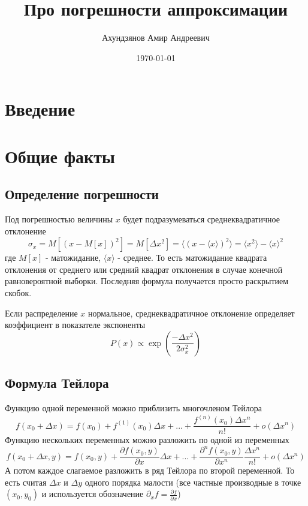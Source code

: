 \documentclass[a4paper,12pt]{article}
\begin{document}
\title{Про погрешности аппроксимации}
\author{Ахундзянов Амир Андреевич}
\date{\today}
\maketitle
\section{Введение}

\section{Общие факты}
\subsection{Определение погрешности}
Под погрешностью величины $x$ будет подразумеваться среднеквадратичное отклонение
$$ \sigma_x = M[(x-M[x])^2] = M[\Delta x^2] = \langle(x - \langle x \rangle)^2\rangle = \langle x^2\rangle - \langle x\rangle^2 $$
где $M[x]$ - матожидание, $\langle x\rangle$ - среднее.
То есть матожидание квадрата отклонения от среднего или средний квадрат отклонения в случае конечной равновероятной выборки. Последняя формула получается просто раскрытием скобок.

Если распределение $x$ нормальное, среднеквадратичное отклонение определяет коэффициент в показателе экспоненты
\[ P(x) \propto \exp \left(\frac{-\Delta x^2}{2\sigma_x^2} \right) \]
\subsection{Формула Тейлора}
Функцию одной переменной можно приблизить многочленом Тейлора
$$ f(x_0 + \Delta x) = f(x_0) + f^{(1)}(x_0) \Delta x + ... + \frac{f^{(n)}(x_0) \Delta x^n}{n!} + o(\Delta x^n)$$
Функцию нескольких переменных можно разложить по одной из переменных
$$ f(x_0 + \Delta x, y) = 
f(x_0, y) + 
\frac{\partial f(x_0, y)}{\partial x} \Delta x + ... + \frac{\partial^n f(x_0, y)}{\partial x^n}\frac{ \Delta x^n}{n!} + o(\Delta x^n)$$
А потом каждое слагаемое разложить в ряд Тейлора по второй переменной. То есть считая $\Delta x$ и $\Delta y$ одного порядка малости (все частные производные в точке $(x_0, y_0)$  и используется обозначение $\partial_x f = \frac{\partial f}{\partial x}$)
\end{document}
